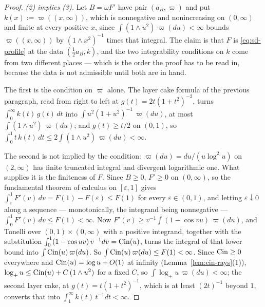 \begin{proof}
\emph{(2) implies (3).} Let $B = \omega F'$ have pair $(a_B,\varpi)$ and put
$k(x) := \varpi((x,\infty))$, which is nonnegative and nonincreasing on $(0,\infty)$ and finite
at every positive $x$, since $\int (1 \wedge u^2)\,\varpi(du) < \infty$ bounds
$\varpi((x,\infty))$ by $(1 \wedge x^2)^{-1}$ times that integral. The claim is that $F$ is
\ref{eq:sd-profile} at the data $(\tfrac12 a_B, k)$, and the two integrability conditions on
$k$ come from two different places --- which is the order the proof has to be read in, because
the data is not admissible until both are in hand.

The first is the \Levy{} condition on $\varpi$ alone. The layer cake formula of the previous
paragraph, read from right to left at $g(t) = 2t(1+t^2)^{-2}$, turns
$\int_0^\infty k(t)\,g(t)\,dt$ into $\int u^2(1+u^2)^{-1}\,\varpi(du)$, at most
$\int (1 \wedge u^2)\,\varpi(du)$; and $g(t) \ge t/2$ on $(0,1)$, so
$\int_0^1 t\,k(t)\,dt \le 2\int (1 \wedge u^2)\,\varpi(du) < \infty$.

The second is not implied by the \Levy{} condition: $\varpi(du) = du/(u\log^2 u)$ on $(2,\infty)$
has finite truncated integral and divergent logarithmic one. What supplies it is the finiteness
of $F$. Since $B \ge 0$, $F' \ge 0$ on $(0,\infty)$, so the fundamental theorem of calculus on
$[\varepsilon,1]$ gives $\int_\varepsilon^1 F'(v)\,dv = F(1) - F(\varepsilon) \le F(1)$ for
every $\varepsilon \in (0,1)$, and letting $\varepsilon \downarrow 0$ along a sequence ---
monotonically, the integrand being nonnegative --- $\int_0^1 F'(v)\,dv \le F(1) < \infty$.
Now $F'(v) \ge v^{-1}\int (1 - \cos vu)\,\varpi(du)$, and Tonelli over
$(0,1) \times (0,\infty)$ with a positive integrand, together with the substitution
$\int_0^1 (1 - \cos uv)\,v^{-1}dv = \operatorname{Cin}(u)$, turns the integral of that lower bound into
$\int \operatorname{Cin}(u)\,\varpi(du)$. So $\int \operatorname{Cin}(u)\,\varpi(du) \le F(1) < \infty$. Since
$\operatorname{Cin} \ge 0$ everywhere and $\operatorname{Cin}(u) = \log u + O(1)$ at infinity
(Lemma~\ref{lem:cin-rays}(1)), $\log_+ u \le \operatorname{Cin}(u) + C\,(1 \wedge u^2)$ for a fixed $C$, so
$\int \log_+ u\,\varpi(du) < \infty$; the second layer cake, at $g(t) = t(1+t^2)^{-1}$, which
is at least $(2t)^{-1}$ beyond $1$, converts that into $\int_1^\infty k(t)\,t^{-1}dt < \infty$.


\end{proof}
